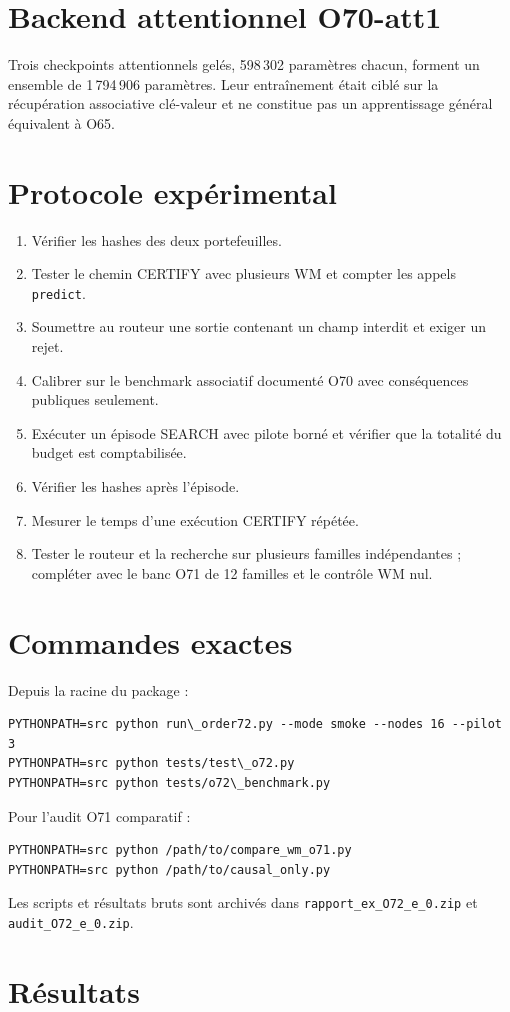\documentclass[11pt,a4paper]{article}
\begin{document}
\section{Backend attentionnel O70-att1}
Trois checkpoints attentionnels gelés, 598\,302 paramètres chacun, forment un ensemble de 1\,794\,906 paramètres. Leur entraînement était ciblé sur la récupération associative clé-valeur et ne constitue pas un apprentissage général équivalent à O65.
\section{Protocole expérimental}
\begin{enumerate}
\item Vérifier les hashes des deux portefeuilles.
\item Tester le chemin CERTIFY avec plusieurs WM et compter les appels \texttt{predict}.
\item Soumettre au routeur une sortie contenant un champ interdit et exiger un rejet.
\item Calibrer sur le benchmark associatif documenté O70 avec conséquences publiques seulement.
\item Exécuter un épisode SEARCH avec pilote borné et vérifier que la totalité du budget est comptabilisée.
\item Vérifier les hashes après l'épisode.
\item Mesurer le temps d'une exécution CERTIFY répétée.
\item Tester le routeur et la recherche sur plusieurs familles indépendantes ; compléter avec le banc O71 de 12 familles et le contrôle WM nul.
\end{enumerate}
\section{Commandes exactes}
Depuis la racine du package :
\begin{verbatim}
PYTHONPATH=src python run\_order72.py --mode smoke --nodes 16 --pilot 3
PYTHONPATH=src python tests/test\_o72.py
PYTHONPATH=src python tests/o72\_benchmark.py
\end{verbatim}
Pour l'audit O71 comparatif :
\begin{verbatim}
PYTHONPATH=src python /path/to/compare_wm_o71.py
PYTHONPATH=src python /path/to/causal_only.py
\end{verbatim}
Les scripts et résultats bruts sont archivés dans \texttt{rapport\_ex\_O72\_e\_0.zip} et \texttt{audit\_O72\_e\_0.zip}.
\section{Résultats}
\end{document}
